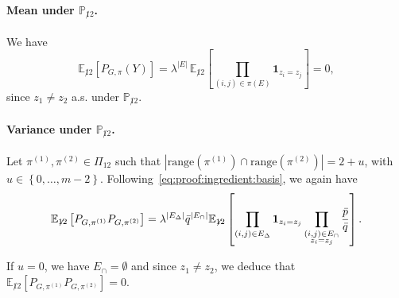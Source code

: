 \documentclass[final]{colt2026}
\newcommand{\1}{\mathbf{1}}
\newcommand{\bbE}{\mathbb{E}}
\newcommand{\bbP}{\mathbb{P}}
\newcommand{\ac}[1]{\left\{#1\right\}}
\newcommand{\cro}[1]{\left[#1\right]}
\begin{document}
\paragraph{Mean under $\bbP_{\not 12}$.}
We have
\begin{equation*}
\bbE_{\not 12}\cro{P_{G,\pi}(Y)}= \lambda^{|E|} \,\bbE_{\not 12}\cro{\prod_{(i,j)\in \pi(E)}\mathbf 1_{z_{i}=z_{j}}}=0,
\end{equation*}
since $z_{1}\neq z_{2}$ a.s. under  $\bbP_{\not 12}$. 



\paragraph{Variance under $\bbP_{\not 12}$.}
Let $\pi^{(1)},\pi^{(2)}\in \Pi_{12}$ such that $|\text{range}(\pi^{(1)})\cap \text{range}(\pi^{(2)})|=2+u$, with $u\in \ac{0,\ldots,m-2}$. Following~\eqref{eq:proof:ingredient:basis}, we again have 
$$\bbE_{\not 12}\cro{P_{G,\pi^{(1)}}P_{G,\pi^{(2)}}}=\lambda^{|E_{\Delta}|} \bar q^{|E_{\cap}|} \bbE_{\not 12}\cro{\prod_{(i,j)\in E_{\Delta}}\mathbf 1_{z_{i}=z_{j}}\prod_{\substack{(i,j)\in E_{\cap}\\ z_{i}=z_{j}}}{\bar p\over \bar q}}.$$
\smallskip

If $u=0$, we have $E_{\cap}=\emptyset$ and since $z_1\neq z_2$, we deduce that 
$\bbE_{\not 12}\cro{P_{G,\pi^{(1)}}P_{G,\pi^{(2)}}}=0$. 

 \medskip 
\end{document}
